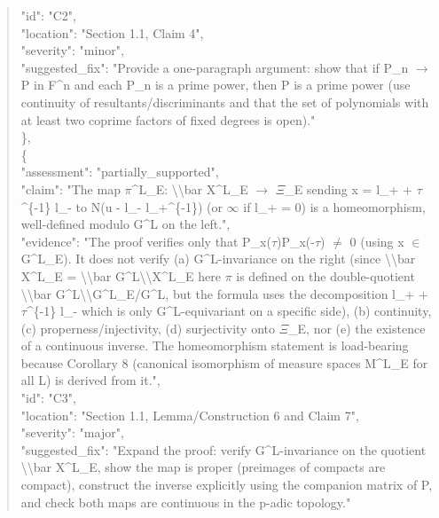 \documentclass[11pt]{article}
\begin{document}
\begin{quote}
      "id": "C2",\\
      "location": "Section 1.1, Claim 4",\\
      "severity": "minor",\\
      "suggested\_fix": "Provide a one-paragraph argument: show that if P\_n \ensuremath{\to} P in F\^{}n and each P\_n is a prime power, then P is a prime power (use continuity of resultants/discriminants and that the set of polynomials with at least two coprime factors of fixed degrees is open)."\\
    \},\\
    \{\\
      "assessment": "partially\_supported",\\
      "claim": "The map \ensuremath{\pi}\^{}L\_E: \textbackslash{}\textbackslash{}bar X\^{}L\_E \ensuremath{\to} \ensuremath{\Xi}\_E sending x = l\_+ + \ensuremath{\tau}\^{}\{-1\} l\_- to N(u - l\_- l\_+\^{}\{-1\}) (or \ensuremath{\infty} if l\_+ = 0) is a homeomorphism, well-defined modulo G\^{}L on the left.",\\
      "evidence": "The proof verifies only that P\_x(\ensuremath{\tau})P\_x(-\ensuremath{\tau}) \ensuremath{\ne} 0 (using x \ensuremath{\in} G\^{}L\_E). It does not verify (a) G\^{}L-invariance on the right (since \textbackslash{}\textbackslash{}bar X\^{}L\_E = \textbackslash{}\textbackslash{}bar G\^{}L\textbackslash{}\textbackslash{}X\^{}L\_E here \ensuremath{\pi} is defined on the double-quotient \textbackslash{}\textbackslash{}bar G\^{}L\textbackslash{}\textbackslash{}G\^{}L\_E/G\^{}L, but the formula uses the decomposition l\_+ + \ensuremath{\tau}\^{}\{-1\} l\_- which is only G\^{}L-equivariant on a specific side), (b) continuity, (c) properness/injectivity, (d) surjectivity onto \ensuremath{\Xi}\_E, nor (e) the existence of a continuous inverse. The homeomorphism statement is load-bearing because Corollary 8 (canonical isomorphism of measure spaces M\^{}L\_E for all L) is derived from it.",\\
      "id": "C3",\\
      "location": "Section 1.1, Lemma/Construction 6 and Claim 7",\\
      "severity": "major",\\
      "suggested\_fix": "Expand the proof: verify G\^{}L-invariance on the quotient \textbackslash{}\textbackslash{}bar X\^{}L\_E, show the map is proper (preimages of compacts are compact), construct the inverse explicitly using the companion matrix of P, and check both maps are continuous in the p-adic topology."\\

\end{quote}
\end{document}
